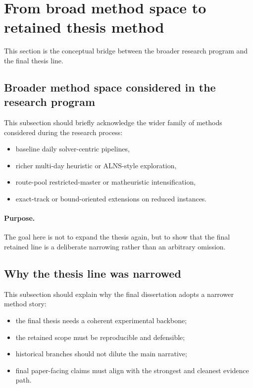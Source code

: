 \section{From broad method space to retained thesis method}
\label{sec:arch_broad_to_retained}

This section is the conceptual bridge between the broader research program and the final thesis line.

\subsection{Broader method space considered in the research program}
\label{subsec:arch_broad_method_space}

This subsection should briefly acknowledge the wider family of methods considered during the research process:
\begin{itemize}
    \item baseline daily solver-centric pipelines,
    \item richer multi-day heuristic or ALNS-style exploration,
    \item route-pool restricted-master or matheuristic intensification,
    \item exact-track or bound-oriented extensions on reduced instances.
\end{itemize}

\paragraph{Purpose.}
The goal here is not to expand the thesis again, but to show that the final retained line is a deliberate narrowing rather than an arbitrary omission.

\subsection{Why the thesis line was narrowed}
\label{subsec:arch_narrowing_rationale}

This subsection should explain why the final dissertation adopts a narrower method story:
\begin{itemize}
    \item the final thesis needs a coherent experimental backbone;
    \item the retained scope must be reproducible and defensible;
    \item historical branches should not dilute the main narrative;
    \item final paper-facing claims must align with the strongest and cleanest evidence path.
\end{itemize}

